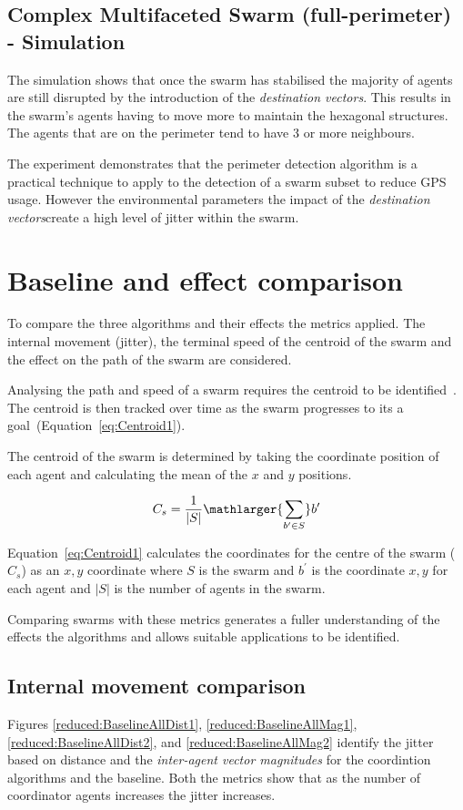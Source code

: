 \documentclass{ieeeaccess}
\begin{document}
\subsection{Complex Multifaceted Swarm (full-perimeter) - Simulation}
The simulation shows that once the swarm has stabilised the majority of agents are still disrupted by the introduction of the \textit{destination vectors}. This results in the swarm's agents having to move more to maintain the hexagonal structures. The agents that are on the perimeter tend to have 3 or more neighbours. 

The experiment demonstrates that the perimeter detection algorithm is a practical technique to apply to the detection of a swarm subset to reduce GPS usage. However the environmental parameters the impact of the \textit{destination vectors}create a high level of jitter within the swarm.

\section{Baseline and effect comparison}\label{sec:compareBaselineAll1}
To compare the three algorithms and their effects the metrics applied. The internal movement (jitter), the terminal speed of the centroid of the swarm and the effect on the path of the swarm are considered. 

Analysing the path and speed of a swarm requires the centroid to be identified~\cite{HAY:08,VG:05,GP:02,GP:04,GP:04a,GP:05,GP:11}. The centroid is then tracked over time as the swarm progresses to its a goal~(Equation~\ref{eq:Centroid1}).

The centroid of the swarm is determined by taking the coordinate position of each agent and calculating the mean of the $x$ and $y$ positions.

\begin{equation}\label{eq:Centroid1}
C_s = \frac{1}{|S|}\mathlarger{\sum_{b' \in S}} b'
\end{equation}

Equation~\ref{eq:Centroid1} calculates the coordinates for the centre of the swarm ($C_s$) as an $x,y$ coordinate where $S$ is the swarm and $b^{'}$ is the coordinate $x,y$ for each agent and $|S|$ is the number of agents in the swarm.

Comparing swarms with these metrics generates a fuller understanding of the effects the algorithms and allows suitable applications to be identified.

\subsection{Internal movement comparison\label{section:stabilityComparison1}}
Figures \ref{reduced:BaselineAllDist1}, \ref{reduced:BaselineAllMag1}, \ref{reduced:BaselineAllDist2}, and \ref{reduced:BaselineAllMag2} identify the jitter based on distance and the \textit{inter-agent vector magnitudes} for the coordintion algorithms and the baseline. Both the metrics show that as the number of coordinator agents increases the jitter increases. 
\end{document}
